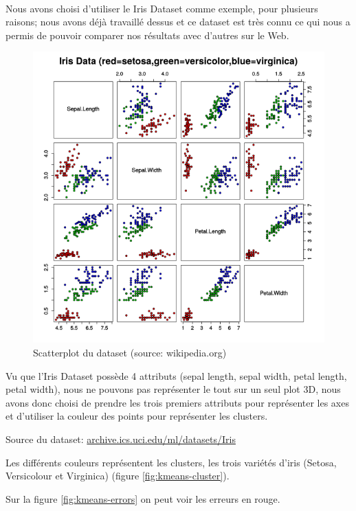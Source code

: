 \documentclass{article}
\begin{document}
  \

  Nous avons choisi d'utiliser le Iris Dataset comme exemple, pour plusieurs raisons;
  nous avons déjà travaillé dessus et ce dataset est très connu ce qui nous a permis de
  pouvoir comparer nos résultats avec d'autres sur le Web.

  \begin{figure}[h]
    \centering
    \includegraphics[scale=0.5]{images/Iris_dataset_scatterplot.png}
    \caption{Scatterplot du dataset (source: wikipedia.org)}
    \label{fig:scatterplot-wiki}
  \end{figure}



  Vu que l'Iris Dataset possède 4 attributs (sepal length, sepal width, petal length, petal width),
  nous ne pouvons pas représenter le tout sur un seul plot 3D, nous avons donc choisi de prendre les trois premiers attributs
  pour représenter les axes
  et d'utiliser la couleur des points pour représenter les clusters.

  Source du dataset: \url{archive.ics.uci.edu/ml/datasets/Iris}

  Les différents couleurs représentent les clusters, les trois variétés d'iris (Setosa, Versicolour et Virginica)  (figure \ref{fig:kmeans-cluster}).

  Sur la figure \ref{fig:kmeans-errors} on peut voir les erreurs en rouge.
  
\end{document}
